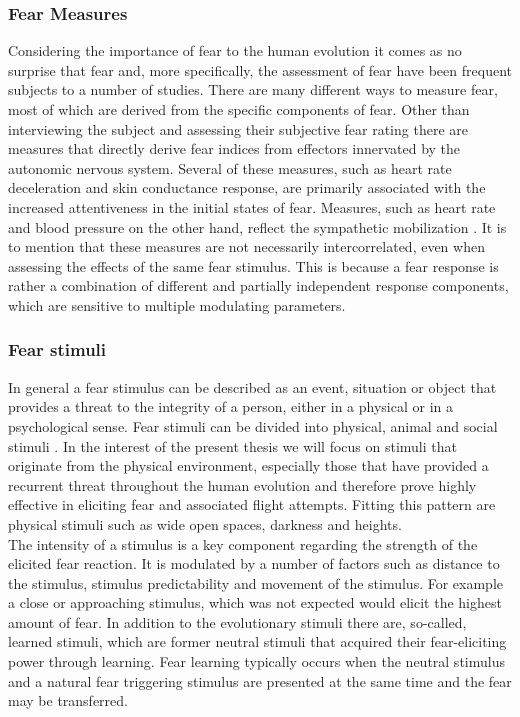 \subsubsection{Fear Measures} 
Considering the importance of fear to the human evolution it comes as no surprise that fear and, more specifically, the assessment of fear have been frequent subjects to a number of studies. There are many different ways to measure fear, most of which are derived from the specific components of fear. Other than interviewing the subject and assessing their subjective fear rating there are measures that directly derive fear indices from effectors innervated by the autonomic nervous system. Several of these measures, such as heart rate deceleration and skin conductance response, are primarily associated with the increased attentiveness in the initial states of fear. Measures, such as heart rate and blood pressure on the other hand, reflect the sympathetic mobilization \cite{FINK2010}. It is to mention that these measures are not necessarily intercorrelated, even when assessing the effects of the same fear stimulus. This is because a fear response is rather a combination of different and partially independent response components, which are sensitive to multiple modulating parameters.

\subsubsection{Fear stimuli} 
In general a fear stimulus can be described as an event, situation or object that provides a threat to the integrity of a person, either in a physical or in a psychological sense. Fear stimuli can be divided into physical, animal and social stimuli \cite{FINK2010}. In the interest of the present thesis we will focus on stimuli that originate from the physical environment, especially those that have provided a recurrent threat throughout the human evolution and therefore prove highly effective in eliciting fear and associated flight attempts. Fitting this pattern are physical stimuli such as wide open spaces, darkness and heights. \\
The intensity of a stimulus is a key component regarding the strength of the elicited fear reaction. It is modulated by a number of factors such as distance to the stimulus, stimulus predictability and movement of the stimulus. For example a close or approaching stimulus, which was not expected would elicit the highest amount of fear. In addition to the evolutionary stimuli there are, so-called, learned stimuli, which are former neutral stimuli that acquired their fear-eliciting power through learning. Fear learning typically occurs when the neutral stimulus and a natural fear triggering stimulus are presented at the same time and the fear may be transferred.

